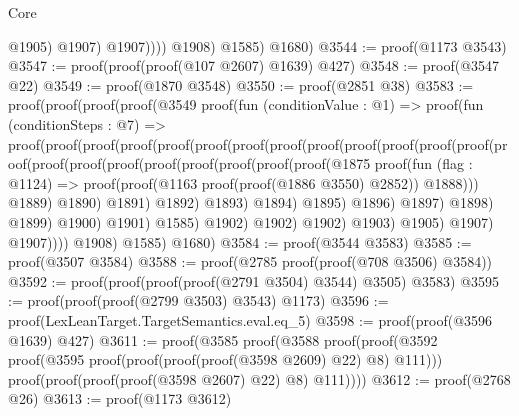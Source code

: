 \begin{lexlean}{Core}
\begin{coremodule}
                        @1905)
                      @1907)
                    @1907))))
          @1908)
        @1585)
      @1680)
@3544 := proof(@1173 @3543)
@3547 := proof(proof(proof(@107 @2607) @1639) @427)
@3548 := proof(@3547 @22)
@3549 := proof(@1870 @3548)
@3550 := proof(@2851 @38)
@3583 := proof(proof(proof(proof(@3549
            proof(fun (conditionValue : @1) =>
              proof(fun (conditionSteps : @7) =>
                proof(proof(proof(proof(proof(proof(proof(proof(proof(proof(proof(proof(proof(proof(proof(proof(proof(proof(proof(proof(proof(proof(@1875
                                                              proof(fun (flag : @1124) =>
                                                                proof(proof(@1163
                                                                      proof(proof(@1886 @3550)
                                                                          @2852))
                                                                    @1888)))
                                                            @1889)
                                                          @1890)
                                                        @1891)
                                                      @1892)
                                                    @1893)
                                                  @1894)
                                                @1895)
                                              @1896)
                                            @1897)
                                          @1898)
                                        @1899)
                                      @1900)
                                    @1901)
                                  @1585)
                                @1902)
                              @1902)
                            @1902)
                          @1903)
                        @1905)
                      @1907)
                    @1907))))
          @1908)
        @1585)
      @1680)
@3584 := proof(@3544 @3583)
@3585 := proof(@3507 @3584)
@3588 := proof(@2785 proof(proof(@708 @3506) @3584))
@3592 := proof(proof(proof(proof(@2791 @3504) @3544) @3505) @3583)
@3595 := proof(proof(proof(@2799 @3503) @3543) @1173)
@3596 := proof(LexLeanTarget.TargetSemantics.eval.eq_5)
@3598 := proof(proof(@3596 @1639) @427)
@3611 := proof(@3585
      proof(@3588
          proof(proof(@3592 proof(@3595 proof(proof(proof(proof(@3598 @2609) @22) @8) @111)))
              proof(proof(proof(proof(@3598 @2607) @22) @8) @111))))
@3612 := proof(@2768 @26)
@3613 := proof(@1173 @3612)

\end{coremodule}
\end{lexlean}
